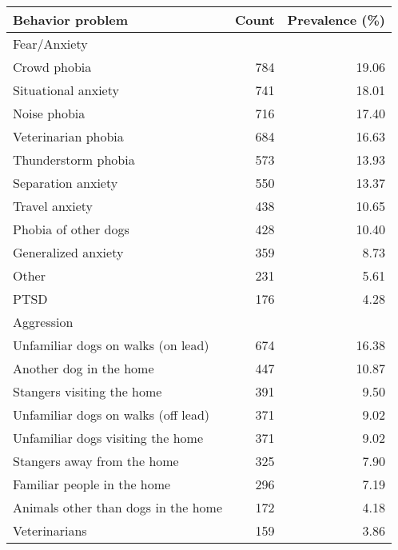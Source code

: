 \documentclass[varwidth=\maxdimen]{standalone}
\newcommand{\subrow}[1]{\hspace{1.25em}#1}
\begin{document}
\begin{tabular}[t]{lrr}
\toprule
Behavior problem &  Count &  Prevalence (\%) \\
\midrule
Fear/Anxiety \\
  \subrow{Crowd phobia}                        &      784 &           19.06 \\
  \subrow{Situational anxiety}                 &      741 &           18.01 \\
  \subrow{Noise phobia}                        &      716 &           17.40 \\
  \subrow{Veterinarian phobia}                 &      684 &           16.63 \\
  \subrow{Thunderstorm phobia}                 &      573 &           13.93 \\
  \subrow{Separation anxiety}                  &      550 &           13.37 \\
  \subrow{Travel anxiety}                      &      438 &           10.65 \\
  \subrow{Phobia of other dogs}                &      428 &           10.40 \\
  \subrow{Generalized anxiety}                 &      359 &            8.73 \\
  \subrow{Other}                               &      231 &            5.61 \\
  \subrow{PTSD}                                &      176 &            4.28 \\
Aggression \\
  \subrow{Unfamiliar dogs on walks (on lead)}  &      674 &           16.38 \\
  \subrow{Another dog in the home}             &      447 &           10.87 \\
  \subrow{Stangers visiting the home}          &      391 &            9.50 \\
  \subrow{Unfamiliar dogs on walks (off lead)} &      371 &            9.02 \\
  \subrow{Unfamiliar dogs visiting the home}   &      371 &            9.02 \\
  \subrow{Stangers away from the home}         &      325 &            7.90 \\
  \subrow{Familiar people in the home}         &      296 &            7.19 \\
  \subrow{Animals other than dogs in the home} &      172 &            4.18 \\
  \subrow{Veterinarians}                       &      159 &            3.86 \\

\end{tabular}
\end{document}

